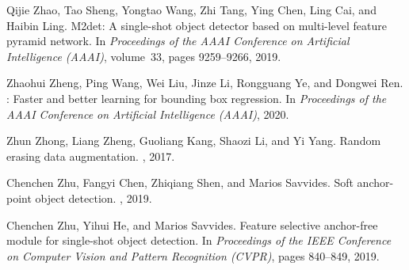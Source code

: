 \documentclass[10pt,twocolumn,letterpaper]{article}
\begin{document}
{\begin{thebibliography}{100}
	Qijie Zhao, Tao Sheng, Yongtao Wang, Zhi Tang, Ying Chen, Ling Cai, and Haibin
	Ling.
	\newblock M2det: A single-shot object detector based on multi-level feature
	pyramid network.
	\newblock In {\em Proceedings of the AAAI Conference on Artificial Intelligence
		(AAAI)}, volume~33, pages 9259--9266, 2019.
	
	Zhaohui Zheng, Ping Wang, Wei Liu, Jinze Li, Rongguang Ye, and Dongwei Ren.
	: Faster and better learning for bounding box
	regression.
	\newblock In {\em Proceedings of the AAAI Conference on Artificial Intelligence
		(AAAI)}, 2020.
	
	Zhun Zhong, Liang Zheng, Guoliang Kang, Shaozi Li, and Yi Yang.
	\newblock Random erasing data augmentation.
	, 2017.
	
	Chenchen Zhu, Fangyi Chen, Zhiqiang Shen, and Marios Savvides.
	\newblock Soft anchor-point object detection.
	, 2019.
	
	Chenchen Zhu, Yihui He, and Marios Savvides.
	\newblock Feature selective anchor-free module for single-shot object
	detection.
	\newblock In {\em Proceedings of the IEEE Conference on Computer Vision and
		Pattern Recognition (CVPR)}, pages 840--849, 2019.
	
\end{thebibliography}
}
\end{document}
